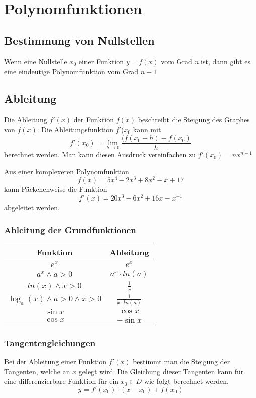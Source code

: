 \documentclass{article}
\author{Philipp Kiss}
\begin{document}

\section{Polynomfunktionen}
\subsection{Bestimmung von Nullstellen}
Wenn eine Nullstelle \(x_0\) einer Funktion \(y = f(x)\) vom Grad \textit{n} ist, dann gibt es eine eindeutige Polynomfunktion vom Grad \(n-1\)
\subsection{Ableitung}
Die Ableitung \(f'(x)\) der Funktion \(f(x)\) beschreibt die Steigung des Graphes von \(f(x)\). Die Ableitungsfunktion \(f'(x_0\) kann mit \[f'(x_0)= \lim_{h \to 0} \frac{(f(x_0 + h) - f(x_0)}{h} \]
berechnet werden. Man kann diesen Ausdruck vereinfachen zu \(f'(x_0) = nx^{n-1}\)

Aus einer komplexeren Polynomfunktion \[
		f(x) = 5x^4-2x^3+8x^2-x+17
\]
kann Päckchenweise die Funktion \[
		f'(x) = 20x^3-6x^2+16x-x^{-1}
\] abgeleitet werden.
\subsubsection{Ableitung der Grundfunktionen}
\begin{table}[h!]
		\begin{center}
				\begin{tabular}{c|c}
						\textbf{Funktion} & \textbf{Ableitung} \\
						\hline
						$e^{x}$ & $e^{x}$\\
						\hline
						$a^{x} \land a > 0$ & $a^{x} \cdot ln(a)$\\
						\hline
						$ln(x) \land x > 0$ & $ \frac{1}{x} $ \\
						\hline
						$ \log_{a}(x) \land a > 0 \land x > 0$ & $ \frac{1}{x\cdot ln(a)} $\\
						\hline
						$\sin x$ & $\cos x$ \\
						\hline
						$\cos x$ & $- \sin x$
				\end{tabular}
		\end{center}
\end{table}
\subsubsection{Tangentengleichungen}
Bei der Ableitung einer Funktion $f'(x)$ bestimmt man die Steigung der Tangenten, welche an $x$ gelegt wird. Die Gleichung dieser Tangenten kann für eine differenzierbare Funktion für ein $x_0 \in D$ wie folgt berechnet werden.
$$y = f'(x_0) \cdot (x-x_0) +f(x_0)$$
\end{document}
